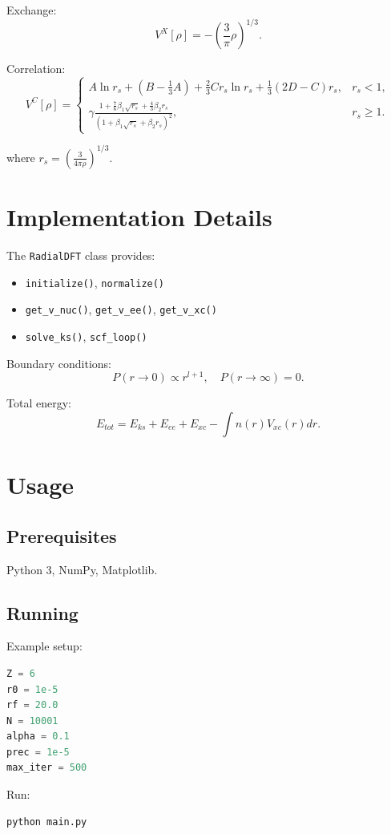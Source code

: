 \documentclass[12pt,a4paper]{article}
\begin{document}
Exchange:
\[
V^X[\rho] = -\left(\frac{3}{\pi}\rho\right)^{1/3}.
\]

Correlation:
\[
V^C[\rho] =
\begin{cases}
A\ln r_s + \left(B - \tfrac{1}{3}A\right) + \tfrac{2}{3}C r_s \ln r_s + \tfrac{1}{3}(2D-C)r_s, & r_s < 1, \\
\gamma \frac{1 + \tfrac{7}{6}\beta_1 \sqrt{r_s} + \tfrac{4}{3}\beta_2 r_s}{(1 + \beta_1 \sqrt{r_s} + \beta_2 r_s)^2}, & r_s \ge 1.
\end{cases}
\]

where $r_s = \left(\frac{3}{4\pi \rho}\right)^{1/3}$.

\section{Implementation Details}

The \texttt{RadialDFT} class provides:
\begin{itemize}
    \item \texttt{initialize()}, \texttt{normalize()}
    \item \texttt{get\_v\_nuc()}, \texttt{get\_v\_ee()}, \texttt{get\_v\_xc()}
    \item \texttt{solve\_ks()}, \texttt{scf\_loop()}
\end{itemize}

Boundary conditions:
\[
P(r \to 0) \propto r^{l+1}, \quad P(r \to \infty) = 0.
\]

Total energy:
\[
E_{tot} = E_{ks} + E_{ee} + E_{xc} - \int n(r)V_{xc}(r)dr.
\]

\section{Usage}

\subsection{Prerequisites}
Python 3, NumPy, Matplotlib.

\subsection{Running}
Example setup:
\begin{lstlisting}[language=Python]
Z = 6
r0 = 1e-5
rf = 20.0
N = 10001
alpha = 0.1
prec = 1e-5
max_iter = 500
\end{lstlisting}

Run:
\begin{lstlisting}[language=bash]
python main.py
\end{lstlisting}
\end{document}
